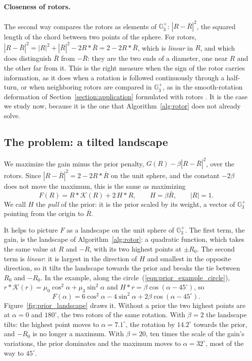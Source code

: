 \documentclass{birkjour}
\theoremstyle{definition}
\theoremstyle{remark}
\numberwithin{equation}{section}
\newcommand{\K}{\mathcal{K}}
\newcommand{\Ge}{\mathbb{G}}
\begin{document}
\paragraph{Closeness of rotors.} The second way compares the rotors as elements of $\Ge_3^+$: $|R - \bar R|^2$, the squared length of the chord between two points of the sphere. For rotors, $|R - \bar R|^2 = |R|^2 + |\bar R|^2 - 2 R * \bar R = 2 - 2 R * \bar R$, which is \emph{linear} in $R$, and which does distinguish $\bar R$ from $-\bar R$: they are the two ends of a diameter, one near $R$ and the other far from it. This is the right measure when the sign of the rotor carries information, as it does when a rotation is followed continuously through a half-turn, or when neighboring rotors are compared in $\Ge_3^+$, as in the smooth-rotation deformation of Section~\ref{section:application} formulated with rotors \cite{LopezBelonSRARAP}. It is the case we study now, because it is the one that Algorithm~\ref{alg:rotor} does not already solve.

\subsection{The problem: a tilted landscape}

We maximize the gain minus the prior penalty, $G(R) - \beta |R - \bar R|^2$, over the rotors. Since $|R - \bar R|^2 = 2 - 2 R * \bar R$ on the unit sphere, and the constant $-2\beta$ does not move the maximum, this is the same as maximizing
\begin{equation}
\label{eqn:prior_problem}
F(R) = R * \K(R) + 2\, H * R, \qquad H = \beta \bar R, \qquad |R| = 1 .
\end{equation}
We call $H$ the \emph{pull} of the prior: it is the prior scaled by its weight, a vector of $\Ge_3^+$ pointing from the origin to $\bar R$.

It helps to picture $F$ as a landscape on the unit sphere of $\Ge_3^+$. The first term, the gain, is the landscape of Algorithm~\ref{alg:rotor}: a quadratic function, which takes the same value at $R$ and $-R$, with its two highest points at $\pm R_0$. The second term is \emph{linear}: it is largest in the direction of $H$ and smallest in the opposite direction, so it tilts the landscape towards the prior and breaks the tie between $R_0$ and $-R_0$. In the example, along the circle~(\ref{eqn:prior_example_circle}), $r * \K(r) = \mu_0 \cos^2 \alpha + \mu_3 \sin^2 \alpha$ and $H * r = \beta \cos(\alpha - 45^\circ)$, so
\begin{equation}
\label{eqn:prior_example_F}
F(\alpha) = 6 \cos^2 \alpha - 4 \sin^2 \alpha + 2 \beta \cos(\alpha - 45^\circ).
\end{equation}
Figure~\ref{fig:prior_landscape} draws it. Without a prior the two highest points are at $\alpha = 0$ and $180^\circ$, the two rotors of the same rotation. With $\beta = 2$ the landscape tilts: the highest point moves to $\alpha = 7.1^\circ$, the rotation by $14.2^\circ$ towards the prior, and $-R_0$ is no longer a maximum. With $\beta = 20$, ten times the scale of the gain's variations, the prior dominates and the maximum moves to $\alpha = 32^\circ$, most of the way to $45^\circ$.
\end{document}
